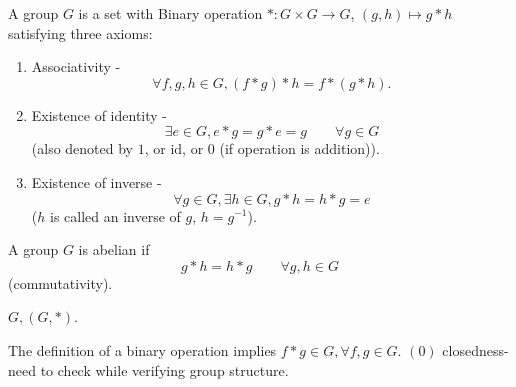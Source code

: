 \documentclass[10pt, a4paper]{article}
\begin{document}
\begin{definition}
    A group $G$ is a set with Binary operation $* : G \times G \to G$,
    $(g, h) \mapsto g * h$ satisfying three axioms:

    \begin{enumerate}[label = (\roman*)]
        \item Associativity -
        \[
        \forall f, g, h \in G, (f * g) * h = f * (g * h).
        \]

        \item Existence of identity -
        \[
        \exists e \in G, e * g = g * e = g\qquad \forall g \in G
        \]
        (also denoted by $1$,
        or $\mathrm{id}$,
        or $0$
        (if operation is addition)).

        \item Existence of inverse -
        \[
        \forall g \in G, \exists h \in G, g * h = h * g = e
        \]
        ($h$ is called an inverse of $g$,
        $h = g ^ {-1}$).
    \end{enumerate}
\end{definition}

\begin{definition}
    A group $G$ is abelian if
    \[
    g * h = h * g\qquad\forall g, h \in G
    \]
    (commutativity).
\end{definition}
$G, (G, *)$.

\begin{remark}
    The definition of a binary operation implies $f * g \in G, \forall f, g \in G$.
    $(0)$ closedness\footnotemark -
    need to check while verifying group structure.

\end{remark}
\end{document}
